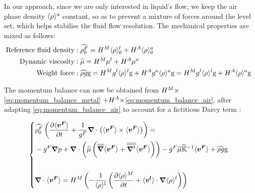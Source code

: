 In our approach, since we are only interested in liquid's flow, we keep the air phase density $\langle \rho \rangle^a$ constant,
so as to prevent a mixture of forces around the level set, which helps stabilise the fluid flow resolution.
The mechanical properties are mixed as follows:
\begin{align}
%
%
\label{eq:monolithic_density_ref}
\text{Reference fluid density}&: \mix{\rho^F_0} = \heavisideM \rhol_0 + \heavisideA \rhoa_0 \\
%
\label{eq:monolithic_viscosity}
\text{Dynamic viscosity}&: \mix{\mu} = \heavisideM \mul + \heavisideA \mua \\
%
\label{eq:monolithic_boussinesq}
\text{Weight force}&: \mix{\rho g} \gravity 	=  \heavisideM \gl \rhol \gravity + \heavisideA \ga \rhoa \gravity
												=  \heavisideM \gl \rhol \gravity + \heavisideA \rhoa \gravity
%
\end{align}

The momentum balance can now be obtained from $H^M \times$\cref{eq:momentum_balance_metal} $+H^A \times$\cref{eq:momentum_balance_air}, after adapting \cref{eq:momentum_balance_air} to account for a fictitious Darcy term :

\begin{equation}
\label{eq:monolithic_momentum}
   \left\{
   \begin{aligned}
      & \widehat{\rho^F_0} \left( \frac{\partial  \langle \boldsymbol{v^F} \rangle }{\partial t}  + \frac{1}{{g^F}} \boldsymbol{\nabla} \cdot \left( \langle \boldsymbol{v^F} \rangle \times \langle \boldsymbol{v^F} \rangle \right) \right) = \\
	  &- {g^F}\boldsymbol{\nabla} p + \boldsymbol{\nabla} \cdot \left( \widehat{\mu} \left( {\overline{\overline{\boldsymbol{\nabla}}}} \langle \boldsymbol{v^F} \rangle+ {\overline{\overline{\boldsymbol{\nabla^\text{t}}}}} \langle \boldsymbol{v^F} \rangle \right)  \right) 
	  - {g^F} \widehat{\mu} \widetilde{\mathbb{K}}^{-1} \langle \boldsymbol{v^F} \rangle + \widehat{\rho g} \boldsymbol{\text{g}}\\ \\
      & \boldsymbol{\nabla} \cdot \langle \boldsymbol{v^F} \rangle = H^M \left( -\frac{1}{\langle \rho \rangle^l} \left( \frac{\partial \langle \rho \rangle^M }{\partial t} + \langle \boldsymbol{v^l} \rangle \cdot  \boldsymbol{\nabla} \langle \rho \rangle^l \right) \right)
    \end{aligned}
    \right.
\end{equation}

